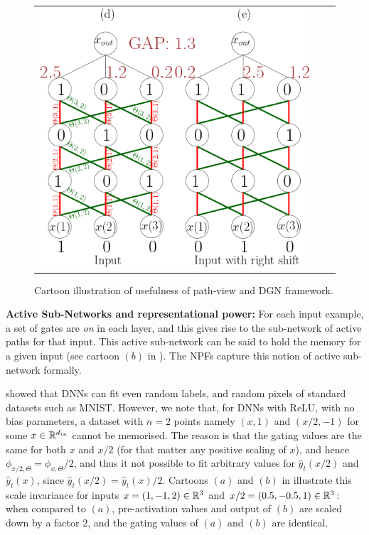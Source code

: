 \begin{figure}[h]
{\begin{tabular}{ccc}
\includegraphics[scale=0.5]{figs/nnconv-size2.png}
\end{tabular}
}
\caption{Cartoon illustration of usefulness of path-view and DGN framework.}
\label{fig:cartoon}
\end{figure}

\textbf{Active Sub-Networks and representational power:} For each input example, a set of gates are \emph{on} in each layer, and this gives rise to the sub-network of active paths for that input. This active sub-network can be said to hold the memory for a given input (see cartoon $(b)$ in ). The NPFs capture this notion of active sub-network formally.

\cite{ben} showed that DNNs can fit even random labels, and random pixels of standard datasets such as MNIST. However, we note that, for DNNs with ReLU, with no bias parameters, a dataset with $n=2$ points namely $(x,1)$ and $(x/2,-1)$ for some $x\in \mathbb{R}^{d_{in}}$ cannot be memorised. The reason is that the gating values are the same for both $x$ and $x/2$ (for that matter any positive scaling of $x$), and hence $\phi_{x/2,\Theta}= \phi_{x,\Theta}/2$, and thus it not possible to fit arbitrary values for $\hat{y}_t(x/2)$ and $\hat{y}_t(x)$, since $\hat{y}_t(x/2)= \hat{y}_t(x)/2$. Cartoons $(a)$ and $(b)$ in  illustrate this scale invariance for inputs $x=(1,-1,2)\in\mathbb{R}^3$ and $x/2=(0.5,-0.5,1)\in\mathbb{R}^3$:  when compared to $(a)$, pre-activation values and output of $(b)$ are scaled down by a factor $2$, and the gating values of $(a)$ and $(b)$ are identical.

